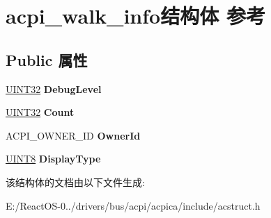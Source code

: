 \hypertarget{structacpi__walk__info}{}\section{acpi\+\_\+walk\+\_\+info结构体 参考}
\label{structacpi__walk__info}
\subsection*{Public 属性}
\begin{DoxyCompactItemize}
\item 
\mbox{\label{structacpi__walk__info_a1abac74953e475f8668a2e6c2237062a}} 
\hyperlink{_processor_bind_8h_ae1e6edbbc26d6fbc71a90190d0266018}{U\+I\+N\+T32} {\bfseries Debug\+Level}
\item 
\mbox{\label{structacpi__walk__info_a1d0bc095e921a0a47738b8831ce99d89}} 
\hyperlink{_processor_bind_8h_ae1e6edbbc26d6fbc71a90190d0266018}{U\+I\+N\+T32} {\bfseries Count}
\item 
\mbox{\label{structacpi__walk__info_a5b14db04da8e8031a5a5da551c111b79}} 
A\+C\+P\+I\+\_\+\+O\+W\+N\+E\+R\+\_\+\+ID {\bfseries Owner\+Id}
\item 
\mbox{\label{structacpi__walk__info_a962d0440252a74fef461670664a37bf6}} 
\hyperlink{_processor_bind_8h_ab27e9918b538ce9d8ca692479b375b6a}{U\+I\+N\+T8} {\bfseries Display\+Type}
\end{DoxyCompactItemize}


该结构体的文档由以下文件生成\+:\begin{DoxyCompactItemize}
\item 
E\+:/\+React\+O\+S-\/0../drivers/bus/acpi/acpica/include/acstruct.\+h\end{DoxyCompactItemize}

